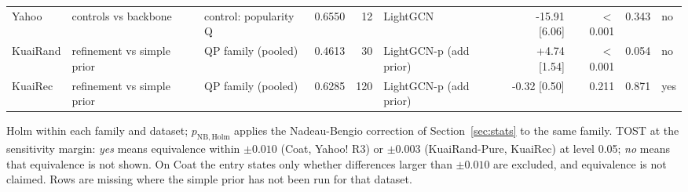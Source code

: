 \begin{table}[htbp]
{\begin{tabular}{lllrrlrrrl}
Yahoo & controls vs backbone & control: popularity Q & 0.6550 & 12 & LightGCN & -15.91 [6.06] & $<$0.001 & 0.343 & no \\
KuaiRand & refinement vs simple prior & QP family (pooled) & 0.4613 & 30 & LightGCN-p (add prior) & +4.74 [1.54] & $<$0.001 & 0.054 & no \\
KuaiRec & refinement vs simple prior & QP family (pooled) & 0.6285 & 120 & LightGCN-p (add prior) & -0.32 [0.50] & 0.211 & 0.871 & yes \\
\bottomrule
\end{tabular}}
\par\smallskip\raggedright\footnotesize Holm within each family and dataset; $p_\mathrm{NB,Holm}$ applies the Nadeau-Bengio correction of Section~\ref{sec:stats} to the same family. TOST at the sensitivity margin: \emph{yes} means equivalence within $\pm0.010$ (Coat, Yahoo! R3) or $\pm0.003$ (KuaiRand-Pure, KuaiRec) at level 0.05; \emph{no} means that equivalence is not shown. On Coat the entry states only whether differences larger than $\pm0.010$ are excluded, and equivalence is not claimed. Rows are missing where the simple prior has not been run for that dataset.
\end{table}
